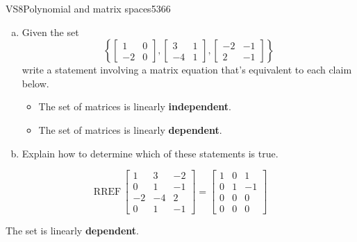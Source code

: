 \begin{exercise}{VS8}{Polynomial and matrix spaces}{5366} 
\begin{exerciseStatement} 

\begin{enumerate}[(a)]
\item  

 Given the set \[\left\{ \left[\begin{array}{cc}
1 & 0 \\
-2 & 0
\end{array}\right] , \left[\begin{array}{cc}
3 & 1 \\
-4 & 1
\end{array}\right] , \left[\begin{array}{cc}
-2 & -1 \\
2 & -1
\end{array}\right] \right\}\] write a statement involving a matrix equation that's equivalent to each claim below. 

 

\begin{itemize}
\item  

 The set of matrices is linearly \textbf{independent}. 

 
\item  

 The set of matrices is linearly \textbf{dependent}. 

 
\end{itemize}

     
\item  

 Explain how to determine which of these statements is true. 

 
\end{enumerate}

     \end{exerciseStatement}
 \begin{exerciseAnswer} 

 \[
\mathrm{RREF}\, \left[\begin{array}{ccc}
1 & 3 & -2 \\
0 & 1 & -1 \\
-2 & -4 & 2 \\
0 & 1 & -1
\end{array}\right] = \left[\begin{array}{ccc}
1 & 0 & 1 \\
0 & 1 & -1 \\
0 & 0 & 0 \\
0 & 0 & 0
\end{array}\right]
            \] 

 

 The set is linearly \textbf{dependent}. 

 \end{exerciseAnswer}
 \end{exercise}


